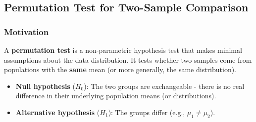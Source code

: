 \documentclass[10pt]{extarticle}
\begin{document}
\subsection{Permutation Test for Two-Sample Comparison}

\subsubsection{Motivation}
A \textbf{permutation test} is a non-parametric hypothesis test that makes minimal assumptions about the data distribution. It tests whether two samples come from populations with the \textbf{same} mean (or more generally, the same distribution).
\begin{itemize}
    \item \textbf{Null hypothesis} ($H_0$): The two groups are exchangeable - there is no real difference in their underlying population means (or distributions).
    \item \textbf{Alternative hypothesis} ($H_1$): The groups differ (e.g., $\mu_1 \neq \mu_2$).
\end{itemize}
\end{document}
